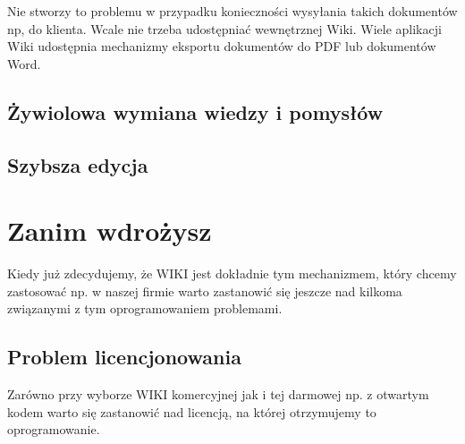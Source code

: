 \documentclass{article}
\begin{document}
Nie stworzy to problemu w przypadku konieczności wysyłania takich dokumentów np, do klienta. Wcale nie trzeba udostępniać wewnętrznej Wiki. Wiele aplikacji Wiki udostępnia mechanizmy eksportu dokumentów do PDF lub dokumentów Word.



	\subsection{Żywiolowa wymiana wiedzy i pomysłów}


	\subsection{Szybsza edycja}


\newpage
\section{Zanim wdrożysz}
Kiedy już zdecydujemy, że WIKI jest dokładnie tym mechanizmem, który chcemy zastosować np. w naszej firmie warto zastanowić się jeszcze nad kilkoma związanymi z tym oprogramowaniem problemami.
	\subsection{Problem licencjonowania}
	Zarówno przy wyborze WIKI komercyjnej jak i tej darmowej np. z otwartym kodem warto się zastanowić nad licencją, na której otrzymujemy to oprogramowanie.
\end{document}
